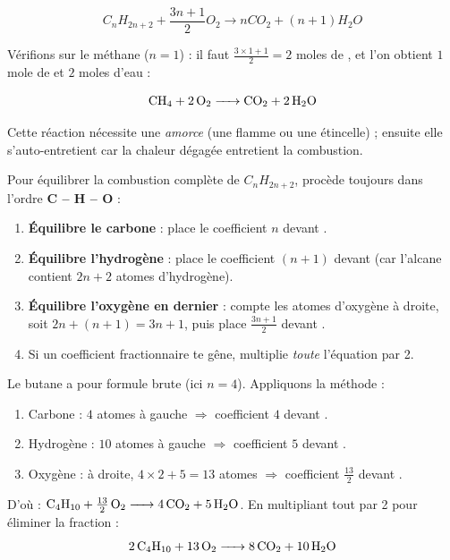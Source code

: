 \documentclass[11pt]{article}
\begin{document}
\[ C_nH_{2n+2} + \frac{3n+1}{2} O_2 \longrightarrow n CO_2 + (n+1) H_2O \]

Vérifions sur le méthane ($n = 1$) : il faut $\frac{3\times 1+1}{2} = 2$ moles de , et l'on obtient $1$ mole de  et $2$ moles d'eau :

\[ \ce{CH4 + 2 O2 -> CO2 + 2 H2O} \]

Cette réaction nécessite une \emph{amorce} (une flamme ou une étincelle) ; ensuite elle s'auto-entretient car la chaleur dégagée entretient la combustion.

\begin{methode}
Pour équilibrer la combustion complète de $C_nH_{2n+2}$, procède toujours dans l'ordre \textbf{C -- H -- O} :
\begin{enumerate}
\item \textbf{Équilibre le carbone} : place le coefficient $n$ devant .
\item \textbf{Équilibre l'hydrogène} : place le coefficient $(n+1)$ devant  (car l'alcane contient $2n+2$ atomes d'hydrogène).
\item \textbf{Équilibre l'oxygène en dernier} : compte les atomes d'oxygène à droite, soit $2n + (n+1) = 3n+1$, puis place $\frac{3n+1}{2}$ devant .
\item Si un coefficient fractionnaire te gêne, multiplie \emph{toute} l'équation par 2.
\end{enumerate}
\end{methode}

\begin{exemplebox}
Le butane a pour formule brute  (ici $n = 4$). Appliquons la méthode :
\begin{enumerate}
\item Carbone : $4$ atomes à gauche $\Rightarrow$ coefficient $4$ devant .
\item Hydrogène : $10$ atomes à gauche $\Rightarrow$ coefficient $5$ devant .
\item Oxygène : à droite, $4\times 2 + 5 = 13$ atomes $\Rightarrow$ coefficient $\frac{13}{2}$ devant .
\end{enumerate}
D'où : $\ce{C4H10 + 13/2 O2 -> 4 CO2 + 5 H2O}$. En multipliant tout par 2 pour éliminer la fraction :
\[ \ce{2 C4H10 + 13 O2 -> 8 CO2 + 10 H2O} \]
\end{exemplebox}
\end{document}
